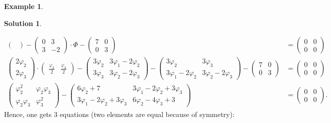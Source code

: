 \documentclass[a4paper,12 pt]{article}
\numberwithin{equation}{section}
\theoremstyle{definition}
\newtheorem{bsp}{Example}
\theoremstyle{remark}
\theoremstyle{definition}
\newtheorem*{lsg}{Solution}
\theoremstyle{definition}
\theoremstyle{definition}
\theoremstyle{remark}
\begin{document}
\begin{bsp}
\begin{lsg}
\begin{enumerate}[(a)]
\begin{equation*}
\begin{split}
\begin{pmatrix}
\end{pmatrix}-\begin{pmatrix} 0&3 \\ 3&-2 
\end{pmatrix}\cdot \Phi-\begin{pmatrix}
7&0\\ 0&3
\end{pmatrix}&=\begin{pmatrix} 0&0 \\ 0&0 \end{pmatrix}\\
\begin{pmatrix}
2 \varphi_2 \\
2 \varphi_3
\end{pmatrix}\cdot 
\begin{pmatrix}
\frac{\varphi_2}{2}&\frac{\varphi_3}{2}
\end{pmatrix}-\begin{pmatrix}
3 \varphi_2 & 3  \varphi_1-2 \varphi_2\\
3 \varphi_3 &3 \varphi_2-2 \varphi_3
\end{pmatrix}-\begin{pmatrix}
3 \varphi_2 & 3 \varphi_3\\
3 \varphi_1 -2 \varphi_2 &3 \varphi_2-2 \varphi_3
\end{pmatrix}-\begin{pmatrix}
7&0\\ 0&3
\end{pmatrix}&=\begin{pmatrix} 0&0 \\ 0&0 \end{pmatrix}\\
 \begin{pmatrix}
\varphi_2^2 & \varphi_2 \varphi_3\\
\varphi_2 \varphi_3 & \varphi_3^2
 \end{pmatrix}-\begin{pmatrix}
6 \varphi_2 +7 &3 \varphi_1 -2 \varphi_2 +3 \varphi_3 \\
3 \varphi_1 -2 \varphi_2 +3 \varphi_3 &6 \varphi_2-4 \varphi_3+3
\end{pmatrix}&=\begin{pmatrix} 0&0 \\ 0&0 \end{pmatrix}.
\end{split}
\end{equation*}
Hence, one gets 3 equations (two elements are equal because of symmetry):
\begin{equation*}

\end{equation*}
\end{enumerate}
\end{lsg}
\end{bsp}
\end{document}
